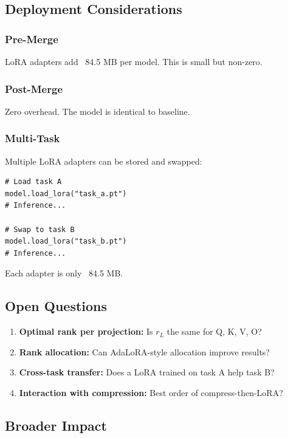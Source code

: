 \subsection{Deployment Considerations}

\subsubsection{Pre-Merge}

LoRA adapters add ~84.5 MB per model. This is small but 
non-zero.

\subsubsection{Post-Merge}

Zero overhead. The model is identical to baseline.

\subsubsection{Multi-Task}

Multiple LoRA adapters can be stored and swapped:

\begin{lstlisting}
# Load task A
model.load_lora("task_a.pt")
# Inference...

# Swap to task B
model.load_lora("task_b.pt")
# Inference...
\end{lstlisting}

Each adapter is only ~84.5 MB.

\subsection{Open Questions}

\begin{enumerate}
\item \textbf{Optimal rank per projection:} Is $r_L$ the same for Q, K, V, O?
\item \textbf{Rank allocation:} Can AdaLoRA-style allocation improve results?
\item \textbf{Cross-task transfer:} Does a LoRA trained on task A help task B?
\item \textbf{Interaction with compression:} Best order of compress-then-LoRA?

\end{enumerate}
\subsection{Broader Impact}

